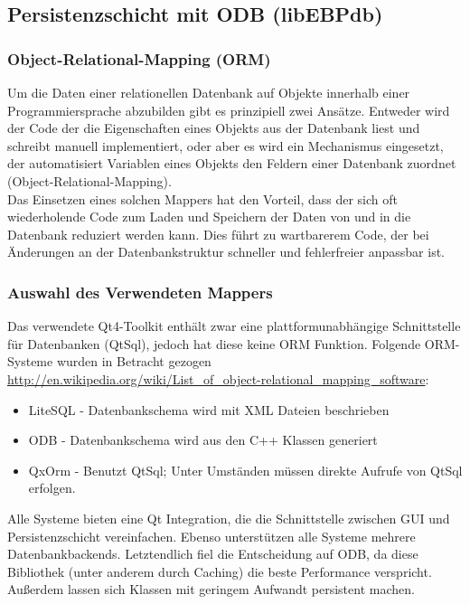 \newpage

\subsection{Persistenzschicht mit ODB (libEBPdb)}

\subsubsection{Object-Relational-Mapping (ORM)}
Um die Daten einer relationellen Datenbank auf Objekte innerhalb einer Programmiersprache abzubilden gibt es prinzipiell zwei Ansätze.
Entweder wird der Code der die Eigenschaften eines Objekts aus der Datenbank liest und schreibt manuell implementiert, oder aber es wird ein Mechanismus eingesetzt, der automatisiert Variablen eines Objekts den Feldern einer Datenbank zuordnet (Object-Relational-Mapping).\\
Das Einsetzen eines solchen Mappers hat den Vorteil, dass der sich oft wiederholende Code zum Laden und Speichern der Daten von und in die Datenbank reduziert werden kann. Dies führt zu wartbarerem Code, der bei Änderungen an der Datenbankstruktur schneller und fehlerfreier anpassbar ist.

\subsubsection{Auswahl des Verwendeten Mappers}
Das verwendete Qt4-Toolkit enthält zwar eine plattformunabhängige Schnittstelle für Datenbanken (QtSql), jedoch hat diese keine ORM Funktion.
Folgende ORM-Systeme wurden in Betracht gezogen\\
\url{http://en.wikipedia.org/wiki/List_of_object-relational_mapping_software}:
\begin{itemize}
	\item LiteSQL - Datenbankschema wird mit XML Dateien beschrieben
	\item ODB - Datenbankschema wird aus den C++ Klassen generiert
	\item QxOrm - Benutzt QtSql; Unter Umständen müssen direkte Aufrufe von QtSql erfolgen. \cite{QxOrm_Tutorial}
\end{itemize}
Alle Systeme bieten eine Qt Integration, die die Schnittstelle zwischen GUI und Persistenzschicht vereinfachen.
Ebenso unterstützen alle Systeme mehrere Datenbankbackends.
Letztendlich fiel die Entscheidung auf ODB, da diese Bibliothek (unter anderem durch Caching) die beste Performance verspricht.
Außerdem lassen sich Klassen mit geringem Aufwandt persistent machen.

